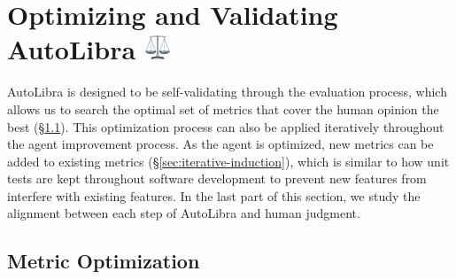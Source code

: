 \documentclass[../main.tex]{subfiles}
\begin{document}
\section{Optimizing and Validating AutoLibra \protect
\includegraphics[height=1em]{figs/scale.png}}
AutoLibra is designed to be self-validating through the evaluation process,
which allows us to search the optimal set of metrics that cover the human
opinion the best (\S\ref{sec:metric-optimization}). This optimization process
can also be applied iteratively throughout the agent improvement process. As the
agent is optimized, new metrics can be added to existing metrics (\S\ref{sec:iterative-induction}),
which is similar to how unit tests are kept throughout software development to
prevent new features from interfere with existing features. In the last part of this
section, we study the alignment between each step of AutoLibra and human
judgment.

\subsection{Metric Optimization}
\label{sec:metric-optimization}
\end{document}
